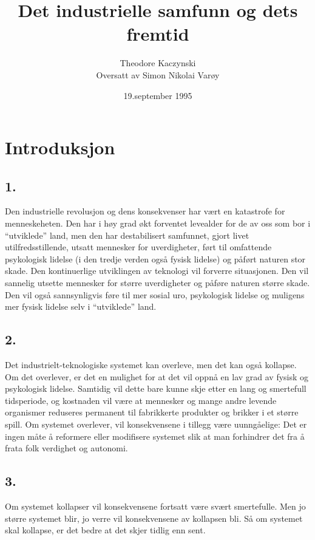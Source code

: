\documentclass[oneside]{book}
\title{Det industrielle samfunn og dets fremtid}
\author{Theodore Kaczynski\\Oversatt av Simon Nikolai Varøy}
\date{19.september 1995}
\begin{document}
\maketitle
\doclicenseThis\par
\tableofcontents

\chapter{Introduksjon}
\section*{1.}
Den industrielle revolusjon og dens konsekvenser har vært en katastrofe for
menneskeheten. Den har i høy grad økt forventet levealder for de av oss som bor
i ``utviklede'' land, men den har destabilisert samfunnet, gjort livet
utilfredsstillende, utsatt mennesker for uverdigheter, ført til omfattende
psykologisk lidelse (i den tredje verden også fysisk lidelse) og påført naturen
stor skade. Den kontinuerlige utviklingen av teknologi vil forverre
situasjonen. Den vil sannelig utsette mennesker for større uverdigheter og
påføre naturen større skade. Den vil også sannsynligvis føre til mer sosial
uro, psykologisk lidelse og muligens mer fysisk lidelse selv i ``utviklede''
land.

\section*{2.}
Det industrielt-teknologiske systemet kan overleve, men det kan også kollapse.
Om det overlever, er det en mulighet for at det vil oppnå en lav grad av fysisk
og psykologisk lidelse. Samtidig vil dette bare kunne skje etter en lang og
smertefull tidsperiode, og kostnaden vil være at mennesker og mange andre
levende organismer reduseres permanent til fabrikkerte produkter og brikker i
et større spill. Om systemet overlever, vil konsekvensene i tillegg være
uunngåelige: Det er ingen måte å reformere eller modifisere systemet slik at
man forhindrer det fra å frata folk verdighet og autonomi.

\section*{3.}
Om systemet kollapser vil konsekvensene fortsatt være svært smertefulle. Men jo
større systemet blir, jo verre vil konsekvensene av kollapsen bli. Så om
systemet skal kollapse, er det bedre at det skjer tidlig enn sent.
\end{document}
